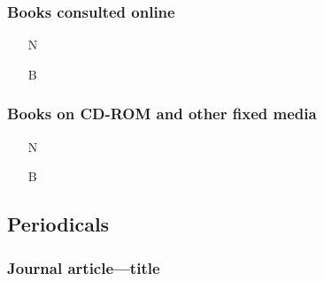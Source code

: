 \documentclass[11pt,letterpaper,oneside]{article}
\begin{document}
\subsubsection{Books consulted online}


\begin{itemize}
\item[N] 

\item[B] 
\end{itemize}

\subsubsection{Books on CD-ROM and other fixed media}

\begin{itemize}
\item[N] 

\item[B] 
\end{itemize}



\setcounter{subsection}{1}
\subsection{Periodicals}
\setcounter{subsection}{14}

\setcounter{subsubsection}{175}
\subsubsection{Journal article---title}
\end{document}
